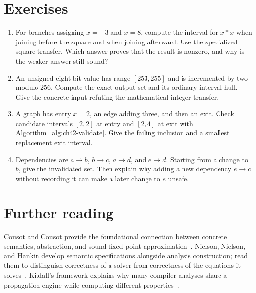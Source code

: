 \section{Exercises}
\label{sec:ch42-exercises}

\begin{enumerate}
\item \label{ex:ch42-square}
For branches assigning $x=-3$ and $x=8$, compute the interval for $x*x$ when joining before the square and when joining afterward.
Use the specialized square transfer.
Which answer proves that the result is nonzero, and why is the weaker answer still sound?
\item \label{ex:ch42-wrap}
An unsigned eight-bit value has range $[253,255]$ and is incremented by two modulo $256$.
Compute the exact output set and its ordinary interval hull.
Give the concrete input refuting the mathematical-integer transfer.
\item \label{ex:ch42-certificate}
A graph has entry $x=2$, an edge adding three, and then an exit.
Check candidate intervals $[2,2]$ at entry and $[2,4]$ at exit with Algorithm~\ref{alg:ch42-validate}.
Give the failing inclusion and a smallest replacement exit interval.
\item \label{ex:ch42-dependencies}
Dependencies are $a\to b$, $b\to c$, $a\to d$, and $e\to d$.
Starting from a change to $b$, give the invalidated set.
Then explain why adding a new dependency $e\to c$ without recording it can make a later change to $e$ unsafe.
\end{enumerate}

\section{Further reading}
\label{sec:ch42-reading}

Cousot and Cousot provide the foundational connection between concrete semantics, abstraction, and sound fixed-point approximation~\cite{cousot-1977-abstract}.
Nielson, Nielson, and Hankin develop semantic specifications alongside analysis construction; read them to distinguish correctness of a solver from correctness of the equations it solves~\cite{nielson-1999-principles}.
Kildall's framework explains why many compiler analyses share a propagation engine while computing different properties~\cite{kildall-1973-dataflow}.
